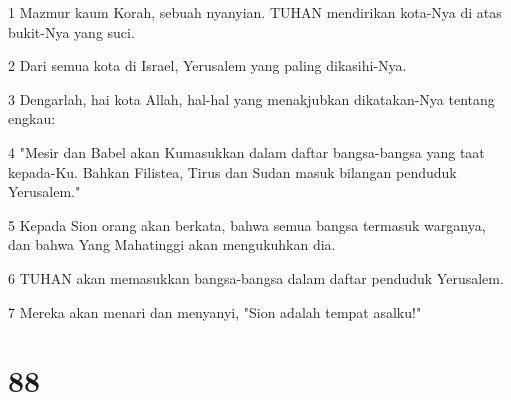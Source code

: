 \par 1 Mazmur kaum Korah, sebuah nyanyian. TUHAN mendirikan kota-Nya di atas bukit-Nya yang suci.
\par 2 Dari semua kota di Israel, Yerusalem yang paling dikasihi-Nya.
\par 3 Dengarlah, hai kota Allah, hal-hal yang menakjubkan dikatakan-Nya tentang engkau:
\par 4 "Mesir dan Babel akan Kumasukkan dalam daftar bangsa-bangsa yang taat kepada-Ku. Bahkan Filistea, Tirus dan Sudan masuk bilangan penduduk Yerusalem."
\par 5 Kepada Sion orang akan berkata, bahwa semua bangsa termasuk warganya, dan bahwa Yang Mahatinggi akan mengukuhkan dia.
\par 6 TUHAN akan memasukkan bangsa-bangsa dalam daftar penduduk Yerusalem.
\par 7 Mereka akan menari dan menyanyi, "Sion adalah tempat asalku!"

\chapter{88}

